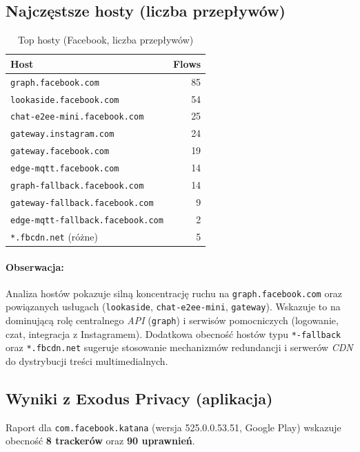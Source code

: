 \subsection{Najczęstsze hosty (liczba przepływów)}
\begin{table}[H]
  \centering
  \caption{Top hosty (Facebook, liczba przepływów)}
  \label{tab:fb-hosts}
  \begin{tabular}{lr}
    \toprule
    \textbf{Host} & \textbf{Flows} \\
    \midrule
    \texttt{graph.facebook.com} & 85 \\
    \texttt{lookaside.facebook.com} & 54 \\
    \texttt{chat-e2ee-mini.facebook.com} & 25 \\
    \texttt{gateway.instagram.com} & 24 \\
    \texttt{gateway.facebook.com} & 19 \\
    \texttt{edge-mqtt.facebook.com} & 14 \\
    \texttt{graph-fallback.facebook.com} & 14 \\
    \texttt{gateway-fallback.facebook.com} & 9 \\
    \texttt{edge-mqtt-fallback.facebook.com} & 2 \\
    \texttt{*.fbcdn.net} (różne) & 5 \\
    \bottomrule
  \end{tabular}
\end{table}

\paragraph{Obserwacja:} 
Analiza hostów pokazuje silną koncentrację ruchu na \texttt{graph.facebook.com} oraz powiązanych usługach (\texttt{lookaside}, \texttt{chat-e2ee-mini}, \texttt{gateway}). Wskazuje to na dominującą rolę centralnego \emph{API} (\texttt{graph}) i serwisów pomocniczych (logowanie, czat, integracja z Instagramem). Dodatkowa obecność hostów typu \texttt{*-fallback} oraz \texttt{*.fbcdn.net} sugeruje stosowanie mechanizmów redundancji i serwerów \emph{CDN} do dystrybucji treści multimedialnych.

\subsection{Wyniki z Exodus Privacy (aplikacja)}
Raport dla \texttt{com.facebook.katana} (wersja 525.0.0.53.51, Google Play) wskazuje obecność \textbf{8 trackerów} oraz \textbf{90 uprawnień}.

